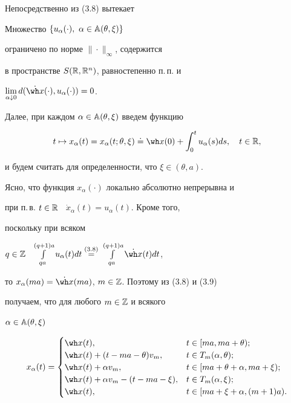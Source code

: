 Непосредственно из (3.8) вытекает





\begin{lems}


Множество $\{u_{\alpha}(\cdot),\ \alpha\in\Bbb A(\theta,\xi)\}$


ограничено по норме $\|\cdot\|_{\infty}$, содержится


в пространстве $S(\Bbb R,\Bbb R^n)$, равностепенно п.\,п. и


$\lim\limits_{\alpha\downarrow 0}d(\Dot{\wh x}(\cdot),u_\alpha(\cdot))=0$.


\end{lems}





Далее, при каждом $\alpha\in{\Bbb A}(\theta,\xi)$ введем функцию


\begin{equation}


t\mapsto x_{\alpha}(t)=x_{\alpha}(t;\theta,\xi)\doteq \wh


x(0)+\int_0^t u_\alpha(s)ds,\quad t\in\Bbb R,


\end{equation}


и будем считать для определенности, что $\xi\in(\theta,a)$.


Ясно, что функция $x_{\alpha}(\cdot)$ локально абсолютно непрерывна и


при п.\,в. $t\in\Bbb R$ \ $\Dot x_\alpha(t)=u_\alpha(t)$. Кроме того,


поскольку при всяком


$q\in{\Bbb Z}$ \ $\int\limits_{qa}^{(q+1)a}u_\alpha(t)dt\up{(3.8)}{=}{}


\int\limits_{qa}^{(q+1)a}\Dot{\wh x}(t)dt$,


то $x_{\alpha}(ma)=\Dot{\wh x}(ma)$, $m\in{\Bbb Z}$. Поэтому из (3.8) и (3.9)


получаем, что для любого $m\in\Bbb Z$ и всякого


$\alpha\in\Bbb A(\theta,\xi)$


\begin{equation}


x_{\alpha}(t)=\begin{cases}


\wh x(t), & t\in[ma,ma+\theta); \\


\wh x(t)+(t-ma-\theta)v_m,& t\in T_m(\alpha,\theta); \\


\wh x(t)+\alpha v_m, & t\in[ma+\theta+\alpha,ma+\xi); \\


\wh x(t)+\alpha v_m-(t-ma-\xi), & t\in T_m(\alpha,\xi); \\


\wh x(t),& t\in[ma+\xi+\alpha,(m+1)a).


\end{cases}


\end{equation}





